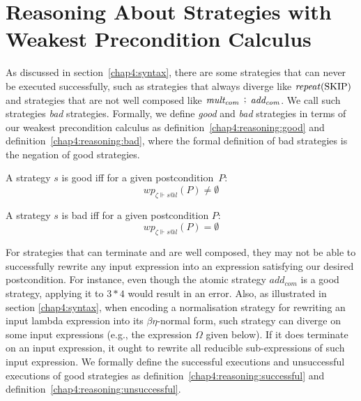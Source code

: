 \section{Reasoning About Strategies with Weakest Precondition Calculus}
\label{chap4:reasoning}
As discussed in section~\ref{chap4:syntax}, there are some strategies that can never be executed successfully, such as strategies that always diverge like $\mathit{repeat}(\text{SKIP})$ and strategies that are not well composed like $\mathit{mult_{com}} \, \mathrel{\mathop;} \, \mathit{add_{com}}$. We call such strategies \textit{bad} strategies. Formally, we define \textit{good} and \textit{bad} strategies in terms of our weakest precondition calculus as definition~\ref{chap4:reasoning:good} and definition~\ref{chap4:reasoning:bad}, where the formal definition of bad strategies is the negation of good strategies.
\begin{definition} A strategy $s$ is good iff for a given postcondition~$P$:
\[wp_{\zeta \Vdash s@l}(P) \neq \emptyset\]
\label{chap4:reasoning:good}
\vspace{-1.5em}
\end{definition}
\vspace{-2.0em}
\begin{definition} A strategy $s$ is bad iff for a given postcondition $P$:
\[wp_{\zeta \Vdash s@l}(P) = \emptyset\]
\label{chap4:reasoning:bad}
\vspace{-1.5em}
\end{definition}
\vspace{-1.0em}

For strategies that can terminate and are well composed, they may not be able to successfully rewrite any input expression into an expression satisfying our desired postcondition. For instance, even though the atomic strategy $\mathit{add_{com}}$ is a good strategy, applying it to $3 * 4$ would result in an error. Also, as illustrated in section \ref{chap4:syntax}, when encoding a normalisation strategy for rewriting an input lambda expression into its $\beta\eta$-normal form, such strategy can diverge on some input expressions (e.g., the expression $\Omega$ given below). If it does terminate on an input expression, it ought to rewrite all reducible sub-expressions of such input expression. We formally define the successful executions and unsuccessful executions of good strategies as definition~\ref{chap4:reasoning:successful} and definition~\ref{chap4:reasoning:unsuccessful}.

